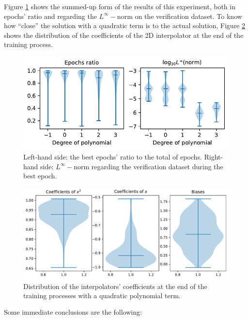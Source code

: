 \documentclass[12pt]{report} %
\begin{document}
Figure \ref{fig:ode-1d-violins} shows the summed-up form of the results of this experiment, both in epochs' ratio and regarding the $L^\infty-$norm on the verification dataset. To know how ``close'' the solution with a quadratic term is to the actual solution, Figure \ref{fig:tr15-c5-quadratic-ode-1d-coefs} shows the distribution of the coefficients of the 2D interpolator at the end of the training process.


\begin{figure}[ht]
  \includegraphics[width=.75\textwidth]{imagenes/experiments/1d/ode/violins.pdf}
  \caption{Left-hand side: the best epochs' ratio to the total of epochs. Right-hand side: $L^\infty-$norm
    regarding the verification dataset during the best epoch.}
  \label{fig:ode-1d-violins}
\end{figure}

\begin{figure}[h]
  \includegraphics[width=.85\textwidth]{imagenes/experiments/1d/ode/approximation_of_actual_solution}
  \caption{Distribution of the interpolators' coefficients at the end of the training processes with a quadratic polynomial term.}
  \label{fig:tr15-c5-quadratic-ode-1d-coefs}
\end{figure}


Some immediate conclusions are the following:
\end{document}
